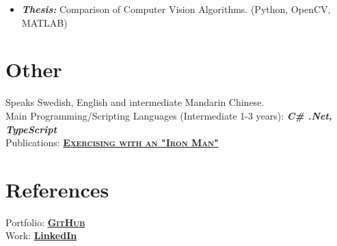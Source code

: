\documentclass[11pt,a4paper,sans,colorlinks,linkcolor=blue,urlcolor=blue]{moderncv}
\begin{document}
{\begin{itemize}
    \setlength{\itemindent}{.25in}
    \itemsep0.3em
    \item \textit{\textbf{Thesis:}} Comparison of Computer Vision Algorithms. (Python, OpenCV, MATLAB)
\end{itemize}}

\section{Other}
Speaks Swedish, English and intermediate Mandarin Chinese.
\\
{Main Programming/Scripting Languages (Intermediate 1-3 years): \textbf{\textit{C\# .Net, TypeScript}}}
\\
Publications: \href{https://arxiv.org/abs/1909.12262}{\textbf{\textsc{Exercising with an "Iron Man"}}}

\section{References}
Portfolio: \href{https://github.com/jacobpihl}{\textbf{\textsc{GitHub}}}
\\
Work: \href{https://www.linkedin.com/in/jacob-pihl-3ba72a141/}{\textbf{LinkedIn}}
\end{document}
